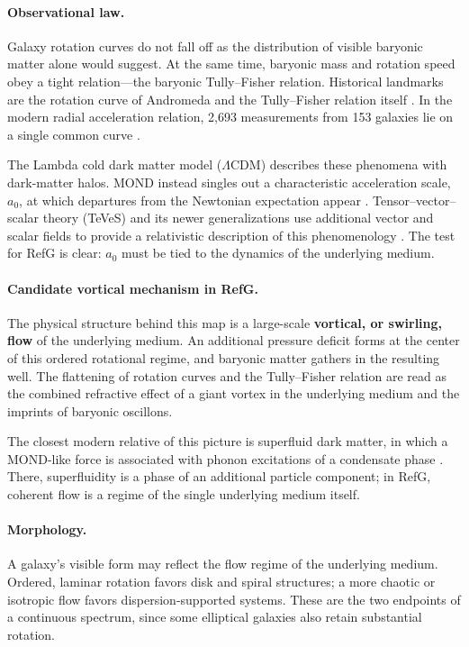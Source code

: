 \documentclass[11pt,a4paper]{article}
\begin{document}
\paragraph{Observational law.}
Galaxy rotation curves do not fall off as the distribution of visible baryonic matter alone would suggest. At the same time, baryonic mass and rotation speed obey a tight relation---the baryonic Tully--Fisher relation. Historical landmarks are the rotation curve of Andromeda \citep{rubin1970} and the Tully--Fisher relation itself \citep{tully1977}. In the modern radial acceleration relation, 2,693 measurements from 153 galaxies lie on a single common curve \citep{mcgaugh2016}.

The Lambda cold dark matter model ($\Lambda$CDM) describes these phenomena with dark-matter halos. MOND instead singles out a characteristic acceleration scale, $a_0$, at which departures from the Newtonian expectation appear \citep{milgrom1983}. Tensor--vector--scalar theory (TeVeS) and its newer generalizations use additional vector and scalar fields to provide a relativistic description of this phenomenology \citep{bekenstein2004,skordis2021}. The test for RefG is clear: $a_0$ must be tied to the dynamics of the underlying medium.

\paragraph{Candidate vortical mechanism in RefG.}
The physical structure behind this map is a large-scale \textbf{vortical, or swirling, flow} of the underlying medium. An additional pressure deficit forms at the center of this ordered rotational regime, and baryonic matter gathers in the resulting well. The flattening of rotation curves and the Tully--Fisher relation are read as the combined refractive effect of a giant vortex in the underlying medium and the imprints of baryonic oscillons.

The closest modern relative of this picture is superfluid dark matter, in which a MOND-like force is associated with phonon excitations of a condensate phase \citep{berezhiani2015}. There, superfluidity is a phase of an additional particle component; in RefG, coherent flow is a regime of the single underlying medium itself.

\paragraph{Morphology.}
A galaxy's visible form may reflect the flow regime of the underlying medium. Ordered, laminar rotation favors disk and spiral structures; a more chaotic or isotropic flow favors dispersion-supported systems. These are the two endpoints of a continuous spectrum, since some elliptical galaxies also retain substantial rotation.
\end{document}
